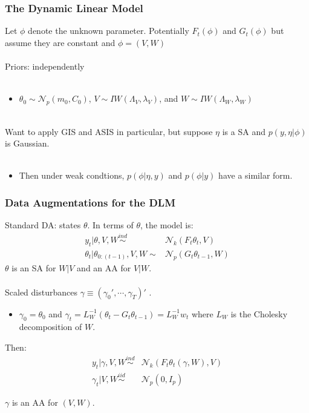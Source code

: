 \documentclass[xcolor=dvipsnames]{beamer}
\newcommand\N{\mathcal{N}}
\begin{document}
\begin{frame}
  \frametitle{The Dynamic Linear Model} 
Let $\phi$ denote the unknown parameter. Potentially $F_t(\phi)$ and $G_t(\phi)$ but assume they are constant and $\phi=(V,W)$\\~\\

Priors: independently \\~\\
\begin{itemize}
\item[]$\theta_0\sim \N_p(m_0,C_0)$, $V\sim IW(\Lambda_V,\lambda_V)$, and $W\sim IW(\Lambda_W,\lambda_W)$\\~\\
\end{itemize}

Want to apply GIS and ASIS in particular, but suppose $\eta$ is a SA and $p(y,\eta|\phi)$ is Gaussian.\\~
\begin{itemize}
\item[] Then under weak condtions, $p(\phi|\eta,y)$ and $p(\phi|y)$ have a similar form.
\end{itemize}

\end{frame}

\begin{frame}
\frametitle{Data Augmentations for the DLM}
Standard DA: states $\theta$. In terms of $\theta$, the model is:
\begin{align*}
y_t|\theta,V,W \stackrel{ind}{\sim} & \N_k(F_t\theta_t,V)\\ 
\theta_t|\theta_{0:(t-1)},V,W \sim & \N_p(G_t\theta_{t-1},W)
\end{align*} 
{\color{blue}$\theta$ is an SA for $W|V$ and an AA for $V|W$.}\\~\\

Scaled disturbances $\gamma\equiv(\gamma_0',\cdots,\gamma_T)'$ \citep{fruhwirth2004efficient}.
\begin{itemize}
\item[]$\gamma_0=\theta_0$ and $\gamma_t=L_W^{-1}(\theta_t - G_t\theta_{t-1})=L_W^{-1}w_t$ where $L_W$ is the Cholesky decomposition of $W$.
\end{itemize}
Then:
\begin{align*}
y_t|\gamma,V,W \stackrel{ind}{\sim} & \N_k(F_t\theta_t(\gamma,W),V) \\
\gamma_t|V,W \stackrel{iid}{\sim} & \N_p(0,I_p)
\end{align*} 

{\color{blue}$\gamma$ is an AA for $(V,W)$.}

\end{frame}
\end{document}
